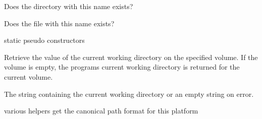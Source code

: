 Does the directory with this name exists?

\label{wxfilenamedirname}


\label{wxfilenamefileexists}



Does the file with this name exists?

\label{wxfilenamefilename}


static pseudo constructors

\label{wxfilenamegetcwd}


Retrieve the value of the current working directory on the specified volume. If
the volume is empty, the programs current working directory is returned for the
current volume.


The string containing the current working directory or an empty string on
error.



\label{wxfilenamegetdircount}



\label{wxfilenamegetdirs}



\label{wxfilenamegetext}



\label{wxfilenamegetformat}


various helpers
get the canonical path format for this platform


\label{wxfilenamegetfullname}

